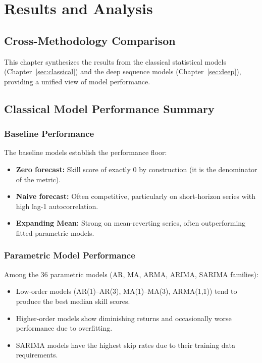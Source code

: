 \section{Results and Analysis}
\label{sec:results}

\subsection{Cross-Methodology Comparison}

This chapter synthesizes the results from the classical statistical models (Chapter~\ref{sec:classical}) and the deep sequence models (Chapter~\ref{sec:deep}), providing a unified view of model performance.

\subsection{Classical Model Performance Summary}

\subsubsection{Baseline Performance}

The baseline models establish the performance floor:

\begin{itemize}
    \item \textbf{Zero forecast:} Skill score of exactly 0 by construction (it is the denominator of the metric).
    \item \textbf{Naive forecast:} Often competitive, particularly on short-horizon series with high lag-1 autocorrelation.
    \item \textbf{Expanding Mean:} Strong on mean-reverting series, often outperforming fitted parametric models.
\end{itemize}

\subsubsection{Parametric Model Performance}

Among the 36 parametric models (AR, MA, ARMA, ARIMA, SARIMA families):

\begin{itemize}
    \item Low-order models (AR(1)--AR(3), MA(1)--MA(3), ARMA(1,1)) tend to produce the best median skill scores.
    \item Higher-order models show diminishing returns and occasionally worse performance due to overfitting.
    \item SARIMA models have the highest skip rates due to their training data requirements.
\end{itemize}

